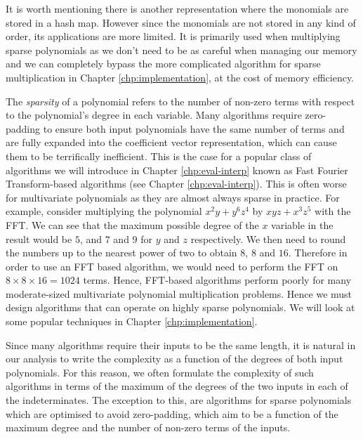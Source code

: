 It is worth mentioning there is another representation where the monomials are stored in a hash map. However since the monomials are not stored in any kind of order, its applications are more limited. It is primarily used when multiplying sparse polynomials as we don't need to be as careful when managing our memory and we can completely bypass the more complicated algorithm for sparse multiplication in Chapter \ref{chp:implementation}, at the cost of memory efficiency.

The \emph{sparsity} of a polynomial refers to the number of non-zero terms with respect to the polynomial's degree in each variable. Many algorithms require zero-padding to ensure both input polynomials have the same number of terms and are fully expanded into the coefficient vector representation, which can cause them to be terrifically inefficient. This is the case for a popular class of algorithms we will introduce in Chapter \ref{chp:eval-interp} known as Fast Fourier Transform-based algorithms (see Chapter \ref{chp:eval-interp}). This is often worse for multivariate polynomials as they are almost always sparse in practice. For example, consider multiplying the polynomial $x^2y + y^6z^4$ by $xyz + x^3z^5$ with the FFT. We can see that the maximum possible degree of the $x$ variable in the result would be $5$, and $7$ and $9$ for $y$ and $z$ respectively. We then need to round the numbers up to the nearest power of two to obtain $8$, $8$ and $16$. Therefore in order to use an FFT based algorithm, we would need to perform the FFT on $8 \times 8 \times 16 = 1024$ terms. Hence, FFT-based algorithms perform poorly for many moderate-sized multivariate polynomial multiplication problems. Hence we must design algorithms that can operate on highly sparse polynomials. We will look at some popular techniques in Chapter \ref{chp:implementation}.

Since many algorithms require their inputs to be the same length, it is natural in our analysis to write the complexity as a function of the degrees of both input polynomials. For this reason, we often formulate the complexity of such algorithms in terms of the maximum of the degrees of the two inputs in each of the indeterminates. The exception to this, are algorithms for sparse polynomials which are optimised to avoid zero-padding, which aim to be a function of the maximum degree and the number of non-zero terms of the inputs.

